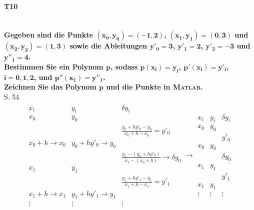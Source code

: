 \documentclass[10pt,a4paper]{article}
\begin{document}
	
	\newpage
	
	
	\paragraph{T10}\mbox{}\\
	\textbf{%
		Gegeben sind die Punkte $\pmb{(x_0,y_0)=(-1,2)}$, $\pmb{(x_1,y_1)=(0,3)}$ und $\pmb{(x_2,y_2)=(1,3)}$ sowie die Ableitungen $\pmb{y'_0=3}$, $\pmb{y'_1=2}$, $\pmb{y'_2=-3}$ und $\pmb{y''_1=4}$.\\
		Bestimmen Sie ein Polynom $\pmb{p}$, sodass $\pmb{p(x_i)=y_i}$, $\pmb{p'(x_i)=y'_i}$, $\pmb{i=0,1,2}$, und $\pmb{p''(x_1)=y''_1}$.\\
		Zeichnen Sie das Polynom $\pmb{p}$ und die Punkte in {\scshape Matlab}.
	}\\
	S. 54 \\
	\begin{align*}
	\begin{array}{ll|c}
		x_i                   & y_i                       &                        \delta y_i                        \\ \hline
		x_0                   & y_0                       &  \\
		                      &                           &          \frac{y_0+hy'_0-y_0}{x_0+h-x_0} = y'_0          \\
		x_0+h \rightarrow x_0 & y_0+hy'_0 \rightarrow y_0 &  \\
		                      &                           & \frac{y_1-(y_0+hy'_0)}{x_1-(x_0+h)}\rightarrow\delta y_0 \\
		x_1                   & y_1                       &  \\
		                      &                           &          \frac{y_1+hy'_1-y_1}{x_1+h-x_1} = y'_1          \\
		x_1+h \rightarrow x_1 & y_1+hy'_1 \rightarrow y_1 &  \\
		\vdots                & \vdots                    &                          \vdots
	\end{array} \rightarrow
		\begin{array}{ll|c}
			x_i    & y_i    & \delta y_i \\ \hline
			x_0    & y_0    &  \\
			       &        &    y'_0    \\
			x_0    & y_0    &  \\
			       &        & \delta y_0 \\
			x_1    & y_1    &  \\
			       &        &    y'_1    \\
			x_1    & y_1    &  \\
			\vdots & \vdots &   \vdots
		\end{array}
	\end{align*}
\end{document}
